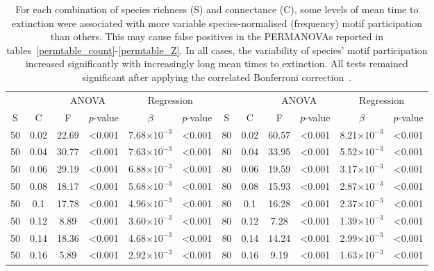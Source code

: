 \documentclass[12pt]{article}
\begin{document}
\begin{spacing}{2.0}
		\begin{table}[hb!]
			\caption{For each combination of species richness (S) and connectance (C), some levels of mean time to extinction were associated with more variable species-normalised (frequency) motif participation than others. This may cause false positives in the PERMANOVAs reported in tables~\ref{permtable_count}-\ref{permtable_Z}. In all cases, the variability of species' motif participation increased significantly with increasingly long mean times to extinction. All tests remained significant after applying the correlated Bonferroni correction~\citep{Drezner2016}.}
			\label{betadisp_freq}
			\footnotesize
			\begin{tabular}{c c | c c| c c ||c c | c c | c c |}
        &&\multicolumn{2}{c|}{ANOVA}&\multicolumn{2}{c||}{Regression}&&&\multicolumn{2}{c|}{ANOVA}&\multicolumn{2}{c|}{Regression}\\
        S&C&F&$p$-value&$\beta$&$p$-value&S&C&F&$p$-value&$\beta$&$p$-value\\
        \hline
        50  & 0.02  & 22.69 & \textless0.001  & 7.68$\times10^{-3}$ & \textless0.001  & 80  & 0.02  & 60.57 & \textless0.001  & 8.21$\times10^{-3}$ & \textless0.001  \\
        50  & 0.04  & 30.77 & \textless0.001  & 7.63$\times10^{-3}$ & \textless0.001  & 80  & 0.04  & 33.95 & \textless0.001  & 5.52$\times10^{-3}$ & \textless0.001  \\
        50  & 0.06  & 29.19 & \textless0.001  & 6.88$\times10^{-3}$ & \textless0.001  & 80  & 0.06  & 19.59 & \textless0.001  & 3.17$\times10^{-3}$ & \textless0.001  \\
        50  & 0.08  & 18.17 & \textless0.001  & 5.68$\times10^{-3}$ & \textless0.001  & 80  & 0.08  & 15.93 & \textless0.001  & 2.87$\times10^{-3}$ & \textless0.001  \\
        50  & 0.1 & 17.78 & \textless0.001  & 4.96$\times10^{-3}$ & \textless0.001  & 80  & 0.1 & 16.28 & \textless0.001  & 2.37$\times10^{-3}$ & \textless0.001  \\
        50  & 0.12  & 8.89  & \textless0.001  & 3.60$\times10^{-3}$ & \textless0.001  & 80  & 0.12  & 7.28  & \textless0.001  & 1.39$\times10^{-3}$ & \textless0.001  \\
        50  & 0.14  & 18.36 & \textless0.001  & 4.68$\times10^{-3}$ & \textless0.001  & 80  & 0.14  & 14.24 & \textless0.001  & 2.99$\times10^{-3}$ & \textless0.001  \\
        50  & 0.16  & 5.89  & \textless0.001  & 2.92$\times10^{-3}$ & \textless0.001  & 80  & 0.16  & 9.19  & \textless0.001  & 1.63$\times10^{-3}$ & \textless0.001  \\

\end{tabular}
\end{table}
\end{spacing}
\end{document}
